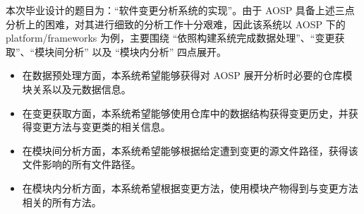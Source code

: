 本次毕业设计的题目为：“软件变更分析系统的实现”。由于 AOSP 具备上述三点分析上的困难，对其进行细致的分析工作十分艰难，因此该系统以 AOSP 下的 platform/frameworks 为例，主要围绕 “依照构建系统完成数据处理”、“变更获取”、“模块间分析” 以及 “模块内分析” 四点展开。

\begin{itemize}
    \item 在数据预处理方面，本系统希望能够获得对 AOSP 展开分析时必要的仓库模块关系以及元数据信息。
    \item 在变更获取方面，本系统希望能够使用仓库中的数据结构获得变更历史，并获得变更方法与变更类的相关信息。
    \item 在模块间分析方面，本系统希望能够根据给定遭到变更的源文件路径，获得该文件影响的所有文件路径。
    \item 在模块内分析方面，本系统希望根据变更方法，使用模块产物得到与变更方法相关的所有方法。
\end{itemize}